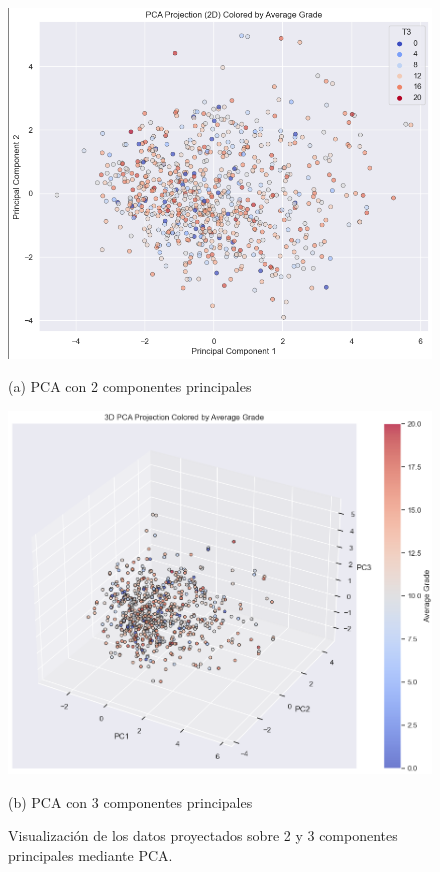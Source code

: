 \documentclass{article}
\begin{document}
\begin{figure}[h!]
  \centering
  \begin{minipage}[b]{0.45\textwidth}
      \centering
      \includegraphics[scale=0.30]{PCA2PC.png}
      \caption*{(a) PCA con 2 componentes principales}
  \end{minipage}
  \hfill
  \begin{minipage}[b]{0.45\textwidth}
      \centering
      \includegraphics[scale=0.28]{PCA3PC.png}
      \caption*{(b) PCA con 3 componentes principales}
  \end{minipage}
  \caption{Visualización de los datos proyectados sobre 2 y 3 componentes principales mediante PCA.}
\end{figure}
\end{document}
